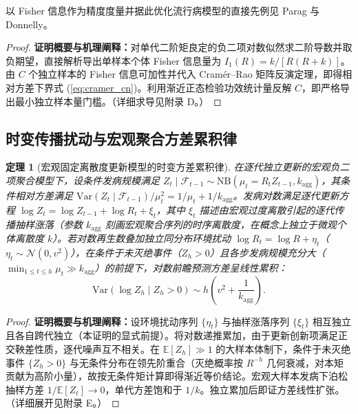 \documentclass[11pt,a4paper]{article}
\theoremstyle{plain}
\newtheorem{theorem}{定理}
\theoremstyle{definition}
\begin{document}
以 Fisher 信息作为精度度量并据此优化流行病模型的直接先例见 Parag 与 Donnelly\citep{parag2020adaptive}。

\begin{proof}
\textbf{证明概要与机理阐释：}对单代二阶矩良定的负二项对数似然求二阶导数并取负期望，直接解析导出单样本个体 Fisher 信息量为 $I_1(R) = k / [R(R+k)]$。由 $C$ 个独立样本的 Fisher 信息可加性并代入 Cram\'er--Rao 矩阵反演定理，即得相对方差下界式 (\ref{eq:cramer_cn})。利用渐近正态检验功效统计量反解 $C$，即严格导出最小独立样本量门槛。（详细求导见附录 D。）
\end{proof}

\subsection{时变传播扰动与宏观聚合方差累积律}

\begin{theorem}[宏观固定离散度更新模型的时变方差累积律]\label{thm:t5}
在逐代独立更新的宏观负二项聚合模型下，设条件发病规模满足 $Z_t \mid \mathcal{F}_{t-1} \sim \text{NB}(\mu_t = R_t Z_{t-1}, k_{\text{agg}})$，其条件相对方差满足 $\text{Var}(Z_t \mid \mathcal{F}_{t-1})/\mu_t^2 = 1/\mu_t + 1/k_{\text{agg}}$。发病对数满足逐代更新方程 $\log Z_t = \log Z_{t-1} + \log R_t + \xi_t$，其中 $\xi_t$ 描述由宏观过度离散引起的逐代传播抽样涨落（参数 $k_{\text{agg}}$ 刻画宏观聚合序列的时序离散度，在概念上独立于微观个体离散度 $k$）。若对数再生数叠加独立同分布环境扰动 $\log R_t = \log R + \eta_t$（$\eta_t \sim \mathcal{N}(0, v^2)$），在条件于未灭绝事件（$Z_h > 0$）且各步发病规模充分大（$\min_{1 \le t \le h} \mu_t \gg k_{\text{agg}}$）的前提下，对数前瞻预测方差呈线性累积：
\begin{equation}
\text{Var}(\log Z_h \mid Z_h > 0) \sim h \left(v^2 + \frac{1}{k_{\text{agg}}}\right).
\end{equation}
\end{theorem}

\begin{proof}
\textbf{证明概要与机理阐释：}设环境扰动序列 $\{\eta_t\}$ 与抽样涨落序列 $\{\xi_t\}$ 相互独立且各自跨代独立（本证明的显式前提）。将对数递推累加，由于更新创新项满足正交鞅差性质，逐代噪声互不相关。在 $\mathbb{E}[Z_h]\gg 1$ 的大样本体制下，条件于未灭绝事件 $\{Z_h>0\}$ 与无条件分布在领先阶重合（灭绝概率按 $R^{-h}$ 几何衰减，对本矩贡献为高阶小量），故按无条件矩计算即得渐近等价结论。宏观大样本发病下泊松抽样方差 $1/\mathbb{E}[Z_t] \to 0$，单代方差饱和于 $1/k$。独立累加后即证方差线性扩张。（详细展开见附录 E。）
\end{proof}
\end{document}

